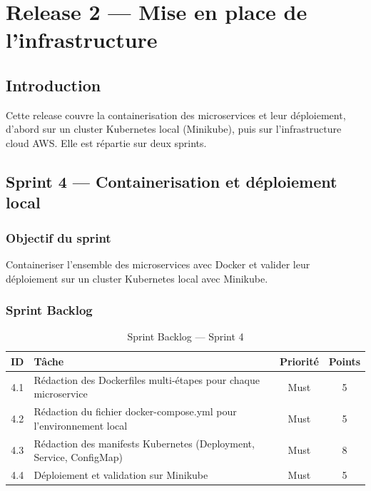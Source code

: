 \chapter{Release 2 --- Mise en place de l'infrastructure}

\section*{Introduction}
Cette release couvre la containerisation des microservices et leur déploiement, d'abord sur un cluster Kubernetes local (Minikube), puis sur l'infrastructure cloud AWS. Elle est répartie sur deux sprints.

\section{Sprint 4 --- Containerisation et déploiement local}

\subsection{Objectif du sprint}
Containeriser l'ensemble des microservices avec Docker et valider leur déploiement sur un cluster Kubernetes local avec Minikube.

\subsection{Sprint Backlog}

\begin{table}[H]
\centering
\renewcommand{\arraystretch}{1.2}
\begin{tabular}{|c|p{9cm}|c|c|}
\hline
\textbf{ID} & \textbf{Tâche} & \textbf{Priorité} & \textbf{Points} \\
\hline
4.1 & Rédaction des Dockerfiles multi-étapes pour chaque microservice & Must & 5 \\
\hline
4.2 & Rédaction du fichier docker-compose.yml pour l'environnement local & Must & 5 \\
\hline
4.3 & Rédaction des manifests Kubernetes (Deployment, Service, ConfigMap) & Must & 8 \\
\hline
4.4 & Déploiement et validation sur Minikube & Must & 5 \\
\hline
\end{tabular}
\caption{Sprint Backlog --- Sprint 4}
\label{tab:sprint4_backlog}
\end{table}

